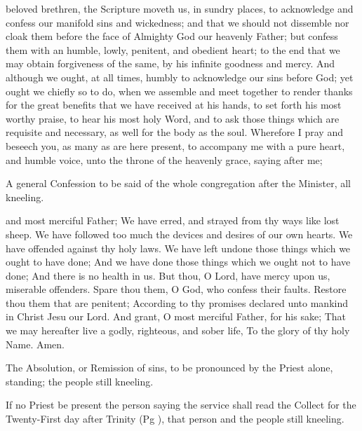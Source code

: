 
 beloved brethren, the Scripture moveth us, in sundry places, to acknowledge and confess our manifold sins and wickedness; and that we should not dissemble nor cloak them before the face of Almighty God our heavenly Father; but confess them with an humble, lowly, penitent, and obedient heart; to the end that we may obtain forgiveness of the same, by his infinite goodness and mercy. And although we ought, at all times, humbly to acknowledge our sins before God; yet ought we chiefly so to do, when we assemble and meet together to render thanks for the great benefits that we have received at his hands, to set forth his most worthy praise, to hear his most holy Word, and to ask those things which are requisite and necessary, as well for the body as the soul. Wherefore I pray and beseech you, as many as are here present, to accompany me with a pure heart, and humble voice, unto the throne of the heavenly grace, saying after me;

\begin{rubric}
A general Confession to be said of the whole congregation after the Minister, all kneeling.
\end{rubric}

 and most merciful Father; We have erred, and strayed from thy ways like lost sheep. We have followed too much the devices and desires of our own hearts. We have offended against thy holy laws. We have left undone those things which we ought to have done; And we have done those things which we ought not to have done; And there is no health in us. But thou, O Lord, have mercy upon us, miserable offenders. Spare thou them, O God, who confess their faults. Restore thou them that are penitent; According to thy promises declared unto mankind in Christ Jesu our Lord. And grant, O most merciful Father, for his sake; That we may hereafter live a godly, righteous, and sober life, To the glory of thy holy Name. Amen.

\newpage

\begin{rubric}
The Absolution, or Remission of sins, to be pronounced by the Priest alone, standing; the people still kneeling.

If no Priest be present the person saying the service shall read the Collect for the Twenty-First day after Trinity (Pg \pageref{collect-trinity-21}), that person and the people still kneeling.
\end{rubric}

